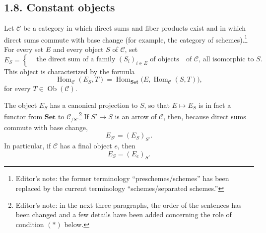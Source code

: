 
\subsection*{1.8. Constant objects}

Let \(\mathscr C\) be a category in which direct sums and fiber products
exist and in which direct sums commute with base change (for example, the
category of schemes).\footnote{Editor's note: the former terminology
``preschemes/schemes'' has been replaced by the current terminology
``schemes/separated schemes.''} For every set \(E\) and every object \(S\) of
\(\mathscr C\), set
\begin{equation}
  \tag{1.8.1}
  E_S=
  \left\{
    \begin{aligned}
      &\text{the direct sum of a family }(S_i)_{i\in E}\text{ of objects}\
      &\text{of }\mathscr C\text{, all isomorphic to }S.
    \end{aligned}
  \right.
\end{equation}
This object is characterized by the formula
\begin{equation}
  \tag{1.8.2}
  \operatorname{Hom}_{\mathscr C}(E_S,T)
  =\operatorname{Hom}_{\mathbf{Set}}
      \bigl(E,\operatorname{Hom}_{\mathscr C}(S,T)\bigr),
\end{equation}
for every \(T\in\operatorname{Ob}(\mathscr C)\).

The object \(E_S\) has a canonical projection to \(S\), so that
\(E\mapsto E_S\) is in fact a functor from \(\mathbf{Set}\) to
\(\mathscr C_{/S}\).\footnote{Editor's note: in the next three paragraphs,
the order of the sentences has been changed and a few details have been added
concerning the role of condition \((*)\) below.} If \(S'\to S\) is an arrow
of \(\mathscr C\), then, because direct sums commute with base change,
\[
  E_{S'}=(E_S)_{S'}.
\]
In particular, if \(\mathscr C\) has a final object \(e\), then
\[
  E_S=(E_e)_S.
\]

